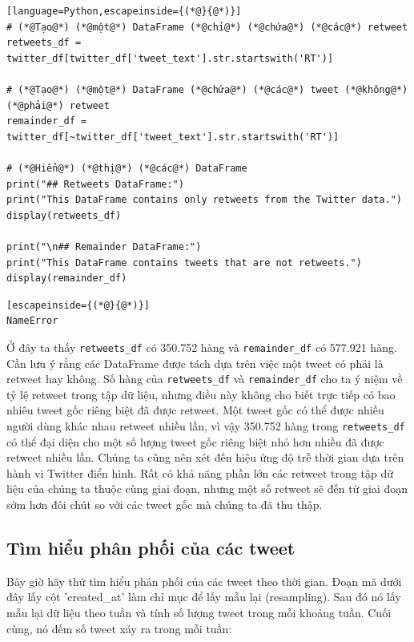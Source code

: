 \begin{lstlisting}[language=Python,escapeinside={(*@}{@*)}]
# (*@Tạo@*) (*@một@*) DataFrame (*@chỉ@*) (*@chứa@*) (*@các@*) retweet
retweets_df = twitter_df[twitter_df['tweet_text'].str.startswith('RT')]

# (*@Tạo@*) (*@một@*) DataFrame (*@chứa@*) (*@các@*) tweet (*@không@*) (*@phải@*) retweet
remainder_df = twitter_df[~twitter_df['tweet_text'].str.startswith('RT')]

# (*@Hiển@*) (*@thị@*) (*@các@*) DataFrame
print("## Retweets DataFrame:")
print("This DataFrame contains only retweets from the Twitter data.")
display(retweets_df)

print("\n## Remainder DataFrame:")
print("This DataFrame contains tweets that are not retweets.")
display(remainder_df)
\end{lstlisting}

\begin{lstlisting}[escapeinside={(*@}{@*)}]
NameError
\end{lstlisting}

Ở đây ta thấy \texttt{retweets\_df} có 350.752 hàng và \texttt{remainder\_df} có 577.921 hàng. Cần lưu ý rằng các DataFrame được tách dựa trên việc một tweet có phải là retweet hay không. Số hàng của \texttt{retweets\_df} và \texttt{remainder\_df} cho ta ý niệm về tỷ lệ retweet trong tập dữ liệu, nhưng điều này không cho biết trực tiếp có bao nhiêu tweet gốc riêng biệt đã được retweet. Một tweet gốc có thể được nhiều người dùng khác nhau retweet nhiều lần, vì vậy 350.752 hàng trong \texttt{retweets\_df} có thể đại diện cho một số lượng tweet gốc riêng biệt nhỏ hơn nhiều đã được retweet nhiều lần. Chúng ta cũng nên xét đến hiệu ứng độ trễ thời gian dựa trên hành vi Twitter điển hình. Rất có khả năng phần lớn các retweet trong tập dữ liệu của chúng ta thuộc cùng giai đoạn, nhưng một số retweet sẽ đến từ giai đoạn sớm hơn đôi chút so với các tweet gốc mà chúng ta đã thu thập.

\subsection{Tìm hiểu phân phối của các tweet}

Bây giờ hãy thử tìm hiểu phân phối của các tweet theo thời gian. Đoạn mã dưới đây lấy cột 'created\_at' làm chỉ mục để lấy mẫu lại (resampling). Sau đó nó lấy mẫu lại dữ liệu theo tuần và tính số lượng tweet trong mỗi khoảng tuần. Cuối cùng, nó đếm số tweet xảy ra trong mỗi tuần:

